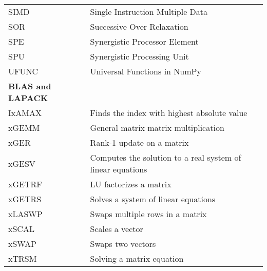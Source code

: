 \begin{center}
\begin{tabular}{ll}
SIMD    & Single Instruction Multiple Data \\
SOR     & Successive Over Relaxation \\
SPE     & Synergistic Processor Element \\
SPU     & Synergistic Processing Unit \\
UFUNC   & Universal Functions in NumPy\\
\hline
\bf{BLAS and LAPACK} & \\
\hline
IxAMAX  & Finds the index with highest absolute value \\
xGEMM   & General matrix matrix multiplication \\
xGER    & Rank-1 update on a matrix \\
xGESV   & Computes the solution to a real system of linear equations \\
xGETRF  & LU factorizes a matrix \\
xGETRS  & Solves a system of linear equations \\
xLASWP  & Swaps multiple rows in a matrix \\
xSCAL   & Scales a vector \\
xSWAP   & Swaps two vectors \\
xTRSM   & Solving a matrix equation \\
\end{tabular}
\end{center}
